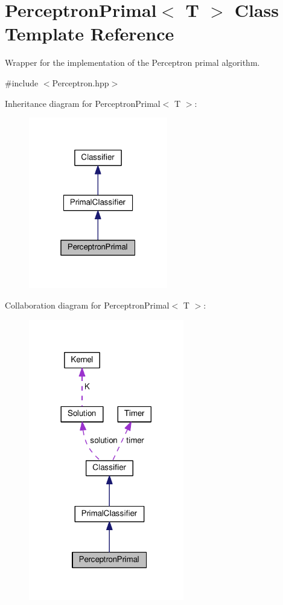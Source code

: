 \hypertarget{class_perceptron_primal}{}\section{Perceptron\+Primal$<$ T $>$ Class Template Reference}
\label{class_perceptron_primal}


Wrapper for the implementation of the Perceptron primal algorithm.  




{\ttfamily \#include $<$Perceptron.\+hpp$>$}



Inheritance diagram for Perceptron\+Primal$<$ T $>$\+:\nopagebreak
\begin{figure}[H]
\begin{center}
\leavevmode
\includegraphics[width=172pt]{class_perceptron_primal__inherit__graph}
\end{center}
\end{figure}


Collaboration diagram for Perceptron\+Primal$<$ T $>$\+:\nopagebreak
\begin{figure}[H]
\begin{center}
\leavevmode
\includegraphics[width=192pt]{class_perceptron_primal__coll__graph}
\end{center}
\end{figure}
